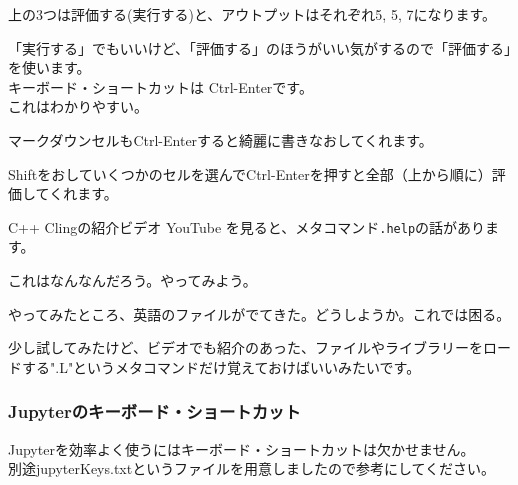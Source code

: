 \documentclass[11pt]{article}
\begin{document}
    上の3つは評価する(実行する)と、アウトプットはそれぞれ5, 5, 7になります。

「実行する」でもいいけど、「評価する」のほうがいい気がするので「評価する」を使います。\\
キーボード・ショートカットは Ctrl-Enterです。\\
これはわかりやすい。

マークダウンセルもCtrl-Enterすると綺麗に書きなおしてくれます。

Shiftをおしていくつかのセルを選んでCtrl-Enterを押すと全部（上から順に）評価してくれます。

    C++ Clingの紹介ビデオ YouTube
を見ると、メタコマンド\texttt{.help}の話があります。

これはなんなんだろう。やってみよう。

やってみたところ、英語のファイルがでてきた。どうしようか。これでは困る。

少し試してみたけど、ビデオでも紹介のあった、ファイルやライブラリーをロードする".L"というメタコマンドだけ覚えておけばいいみたいです。

    \subsubsection{Jupyterのキーボード・ショートカット}\label{jupyterux306eux30adux30fcux30dcux30fcux30c9ux30b7ux30e7ux30fcux30c8ux30abux30c3ux30c8}

Jupyterを効率よく使うにはキーボード・ショートカットは欠かせません。\\
別途jupyterKeys.txtというファイルを用意しましたので参考にしてください。
\end{document}
